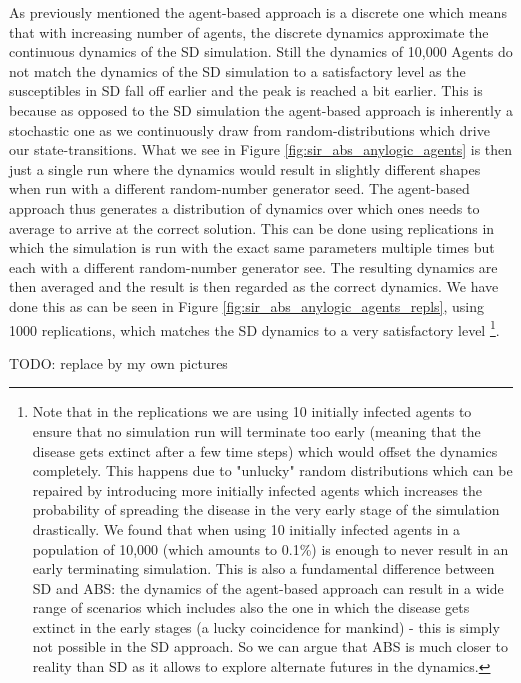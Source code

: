 As previously mentioned the agent-based approach is a discrete one which means that with increasing number of agents, the discrete dynamics approximate the continuous dynamics of the SD simulation. Still the dynamics of 10,000 Agents do not match the dynamics of the SD simulation to a satisfactory level as the susceptibles in SD fall off earlier and the peak is reached a bit earlier. This is because as opposed to the SD simulation the agent-based approach is inherently a stochastic one as we continuously draw from random-distributions which drive our state-transitions. What we see in Figure \ref{fig:sir_abs_anylogic_agents} is then just a single run where the dynamics would result in slightly different shapes when run with a different random-number generator seed. The agent-based approach thus generates a distribution of dynamics over which ones needs to average to arrive at the correct solution. This can be done using replications in which the simulation is run with the exact same parameters multiple times but each with a different random-number generator see. The resulting dynamics are then averaged and the result is then regarded as the correct dynamics. We have done this as can be seen in Figure \ref{fig:sir_abs_anylogic_agents_repls}, using 1000 replications, which matches the SD dynamics to a very satisfactory level \footnote{Note that in the replications we are using 10 initially infected agents to ensure that no simulation run will terminate too early (meaning that the disease gets extinct after a few time steps) which would offset the dynamics completely. This happens due to "unlucky" random distributions which can be repaired by introducing more initially infected agents which increases the probability of spreading the disease in the very early stage of the simulation drastically. We found that when using 10 initially infected agents in a population of 10,000 (which amounts to 0.1\%) is enough to never result in an early terminating simulation. This is also a fundamental difference between SD and ABS: the dynamics of the agent-based approach can result in a wide range of scenarios which includes also the one in which the disease gets extinct in the early stages (a lucky coincidence for mankind) - this is simply not possible in the SD approach. So we can argue that ABS is much closer to reality than SD as it allows to explore alternate futures in the dynamics.}.

TODO: replace by my own pictures

